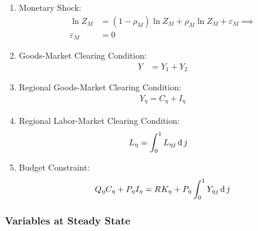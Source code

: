 \documentclass[../thesis.tex]{subfiles}
\begin{document}
\begin{enumerate}
	\item Monetary Shock:
	\begin{align}
		\ln{Z_{M}} &= (1-\rho_M) \ln{Z_{M}} + \rho_M \ln{Z_{M}} + \varepsilon_{M} \implies \nonumber \\
		\varepsilon_{M} &= 0 \label{eq_v2:reg-ss-monetary-shock}
	\end{align}
	
	\item Goods-Market Clearing Condition:
	\begin{align}
		Y_{} &= Y_{1} + Y_{2} \label{eq_v2:reg-ss-market-clearing-condition-Yt}
	\end{align}
	
	\item Regional Goods-Market Clearing Condition:
	\begin{align}
		Y_{\eta} = C_{\eta} + I_{\eta} 
		\label{eq_v2:reg-ss-regional-demand}
	\end{align}

	\item Regional Labor-Market Clearing Condition:
	\begin{align}
		L_{\eta} &= \int_{0}^{1} L_{\eta j} \operatorname{d} j \label{eq_v2:reg-ss-market-clearing-condition-Lt}
	\end{align}
	
	\item Budget Constraint:
	\begin{align}
		Q_{\eta} C_{\eta} + P_{\eta} I_{\eta} = R_{} K_{\eta} + P_{\eta} \int_{0}^{1} Y_{\eta j} \operatorname{d} j \label{eq_v2:reg-ss-budget-constraint-3}
	\end{align}

\end{enumerate}

\newpage


\subsubsection{Variables at Steady State}
\end{document}

